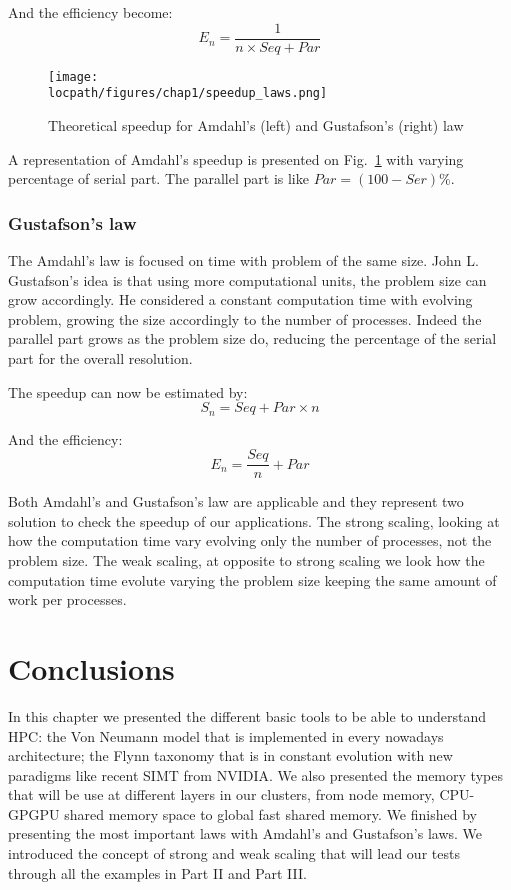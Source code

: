 And the efficiency become:
\begin{equation}
E_n = \frac{1}{n\times Seq + Par}
\end{equation}

\begin{figure}
\texttt{[image: \\locpath/figures/chap1/speedup\_laws.png]}
\caption{Theoretical speedup for Amdahl's (left) and Gustafson's (right) law}
\label{fig:1_HPC:speedup_laws}
\end{figure}

A representation of Amdahl's speedup is presented on Fig.~\ref{fig:1_HPC:speedup_laws} with varying percentage of serial part. 
The parallel part is like $Par = (100-Ser)\%$.

\subsubsection{Gustafson's law}
The Amdahl's law is focused on time with problem of the same size. 
John L. Gustafson's idea is that using more computational units, the problem size can grow accordingly. 
He considered a constant computation time with evolving problem, growing the size accordingly to the number of processes. 
Indeed the parallel part grows as the problem size do, reducing the percentage of the serial part for the overall resolution.

The speedup can now be estimated by:
\begin{equation}
S_n = Seq + Par \times n
\end{equation}

And the efficiency: 
\begin{equation}
E_n = \frac{Seq}{n} + Par
\end{equation}


Both Amdahl's and Gustafson's law are applicable and they represent two solution to check the speedup of our applications. 
The strong scaling, looking at how the computation time vary evolving only the number of processes, not the problem size. 
The weak scaling, at opposite to strong scaling we look how the computation time evolute varying the problem size keeping the same amount of work per processes. 

\section{Conclusions}

In this chapter we presented the different basic tools to be able to understand HPC: the Von Neumann model that is implemented in every nowadays architecture; the Flynn taxonomy that is in constant evolution with new paradigms like recent SIMT from NVIDIA. 
We also presented the memory types that will be use at different layers in our clusters, from node memory, CPU-GPGPU shared memory space to global fast shared memory. 
We finished by presenting the most important laws with Amdahl's and Gustafson's laws.
We introduced the concept of strong and weak scaling that will lead our tests through all the examples in Part II and Part III.

